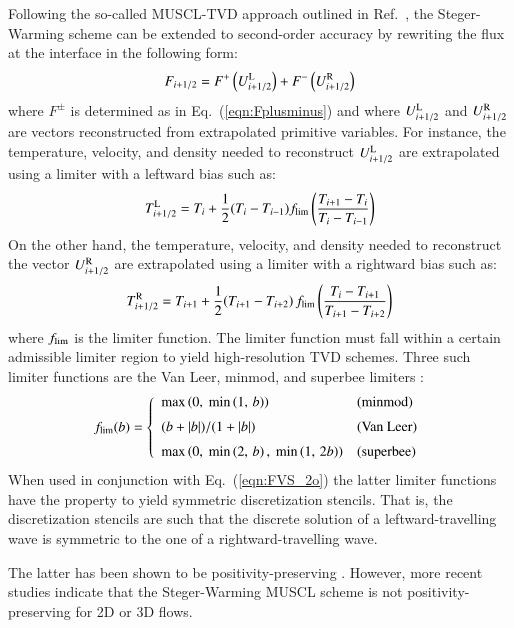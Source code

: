 \documentclass{warpdoc}
\newcommand{\alb}{\vspace{0.2cm}\\} %
\newcommand{\mfd}{\displaystyle}
\let\citen\cite
\begin{document}
Following the so-called MUSCL-TVD approach outlined in Ref.\ \citen{aiaa:1986:anderson}, the Steger-Warming scheme can be extended to second-order accuracy by rewriting the flux at the interface in the following form:
%
\begin{equation}
F_{i+1/2}=F^+\left(U^{\rm L}_{i+1/2}\right)
         +F^-\left(U^{\rm R}_{i+1/2}\right)
\end{equation}
%
where $F^\pm$ is determined as in Eq.\ (\ref{eqn:Fplusminus}) and where $U^{\rm L}_{i+1/2}$ and $U^{\rm R}_{i+1/2}$ are vectors reconstructed from extrapolated primitive variables. For instance, the temperature, velocity, and density needed to reconstruct $U^{\rm L}_{i+1/2}$ are extrapolated using a limiter with a leftward bias such as:
%
\begin{equation}
T^{\rm L}_{i+1/2}=T_i + \mfd\frac{1}{2}(T_i-T_{i-1}) f_{\rm lim}\left(\frac{T_{i+1}-T_i}{T_i-T_{i-1}}   \right)
\end{equation}
%
On the other hand, the temperature, velocity, and density needed to reconstruct the vector $U^{\rm R}_{i+1/2}$ are extrapolated using a limiter with a rightward bias such as: 
%
\begin{equation}
T^{\rm R}_{i+1/2}=T_{i+1} + \mfd\frac{1}{2}(T_{i+1}-T_{i+2}) \, f_{\rm lim}\left(\frac{T_{i}-T_{i+1}}{T_{i+1}-T_{i+2}}  \right) 
\end{equation}
%
where $f_{\rm lim}$ is the limiter function. The limiter function  must fall within a certain admissible limiter region to yield high-resolution TVD schemes. Three such limiter functions are the Van Leer, minmod, and superbee limiters \cite{jcp:1974:vanleer,arfm:1986:roe}:
%
\begin{equation}
{f_{\rm lim}}(b) =
\left\{
\begin{array}{ll}
{\rm max} \left( 0,~ 
{\rm min} \left( 1, \, b  \right) \right)&{\rm (minmod)}\alb
  (b+|b|)/(1+|b|) & ({\rm Van~Leer})\alb
  {\rm max} \left( 0,~ 
{\rm min} \left( 2, \, b  \right) ,~
{\rm min} \left( 1, \, 2 b  \right) 
\right) & {\rm (superbee)}
\end{array}
\right.
\label{eqn:limiterfunction}
\end{equation}
%
When used in conjunction with Eq.\ (\ref{eqn:FVS_2o}) the latter limiter functions have the property to yield symmetric discretization stencils. That is, the discretization stencils are such that the discrete solution of a leftward-travelling wave is symmetric to the one of a rightward-travelling wave.

The latter has been shown to be positivity-preserving \cite{aiaaconf:1997:linde}. However, more recent studies indicate that the Steger-Warming MUSCL scheme is not positivity-preserving for 2D or 3D flows.
\end{document}
